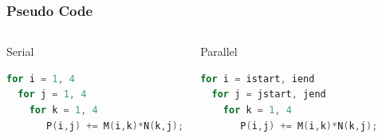 \documentclass[10pt,t]{beamer}
\begin{document}
\begin{frame}[fragile]
  \frametitle{Pseudo Code}
  \begin{columns}
    \begin{exampleblock}{Serial}
      \begin{lstlisting}[language=C]
for i = 1, 4
  for j = 1, 4
    for k = 1, 4
       P(i,j) += M(i,k)*N(k,j);
      \end{lstlisting}
    \end{exampleblock}
    \begin{exampleblock}{Parallel}
      \begin{lstlisting}[language=C]
for i = istart, iend
  for j = jstart, jend
    for k = 1, 4
       P(i,j) += M(i,k)*N(k,j);
      \end{lstlisting}
    \end{exampleblock}
  \end{columns}
\end{frame}
\end{document}
